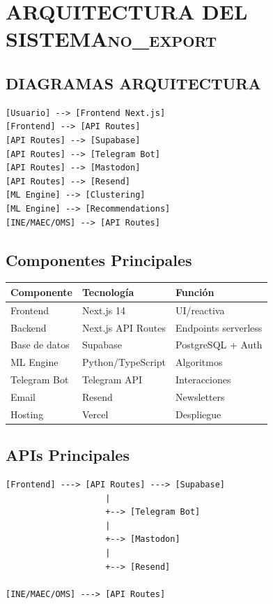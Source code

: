\documentclass[11pt]{article}
\begin{document}
\section{ARQUITECTURA DEL SISTEMA\hfill{}\textsc{no\_export}}
\label{sec:orgcb094a1}
\subsection{DIAGRAMAS ARQUITECTURA}
\label{sec:org619ca2d}

\lstset{language=text,label= ,caption= ,captionpos=b,numbers=none}
\begin{lstlisting}
[Usuario] --> [Frontend Next.js]
[Frontend] --> [API Routes]
[API Routes] --> [Supabase]
[API Routes] --> [Telegram Bot]
[API Routes] --> [Mastodon]
[API Routes] --> [Resend]
[ML Engine] --> [Clustering]
[ML Engine] --> [Recommendations]
[INE/MAEC/OMS] --> [API Routes]
\end{lstlisting}

\subsection{Componentes Principales}
\label{sec:org95b90ff}

\begin{center}
\begin{tabular}{lll}
Componente & Tecnología & Función\\
\hline
Frontend & Next.js 14 & UI/reactiva\\
Backend & Next.js API Routes & Endpoints serverless\\
Base de datos & Supabase & PostgreSQL + Auth\\
ML Engine & Python/TypeScript & Algoritmos\\
Telegram Bot & Telegram API & Interacciones\\
Email & Resend & Newsletters\\
Hosting & Vercel & Despliegue\\
\end{tabular}
\end{center}

\subsection{APIs Principales}
\label{sec:orgf3af991}

\begin{verbatim}
[Frontend] ---> [API Routes] ---> [Supabase]
                    |
                    +--> [Telegram Bot]
                    |
                    +--> [Mastodon]
                    |
                    +--> [Resend]

[INE/MAEC/OMS] ---> [API Routes]
\end{verbatim}
\end{document}
